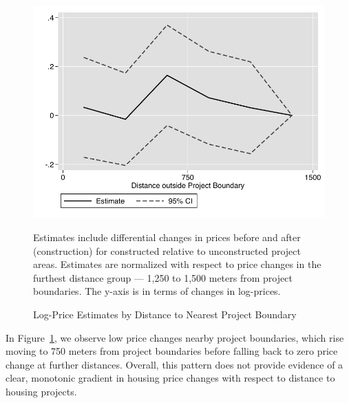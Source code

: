 \documentclass[12pt]{article}
\begin{document}
\begin{figure}[!htb]
       { \centering
   \caption[ Log-Price Estimates by Distance to Nearest Project Boundary ]
    {\small Log-Price Estimates by Distance to Nearest Project Boundary }\label{figure:pricesoverdistance}
\includegraphics[width=\textwidth,trim={0.3cm .3cm 0.1cm 0cm}, clip=true]{figures/price_dist_3d_ctrl_q_one.pdf}
} 
Estimates include differential changes in prices before and after (construction) for constructed relative to unconstructed project areas.  Estimates are normalized with respect to price changes in the furthest distance group --- 1,250 to 1,500 meters from project boundaries.  The y-axis is in terms of changes in log-prices.
\end{figure}

In Figure~\ref{figure:pricesoverdistance}, we observe low price changes nearby project boundaries, which rise moving to 750 meters from project boundaries before falling back to zero price change at further distances.  Overall, this pattern does not provide evidence of a clear, monotonic gradient in housing price changes with respect to distance to housing projects.
\end{document}
